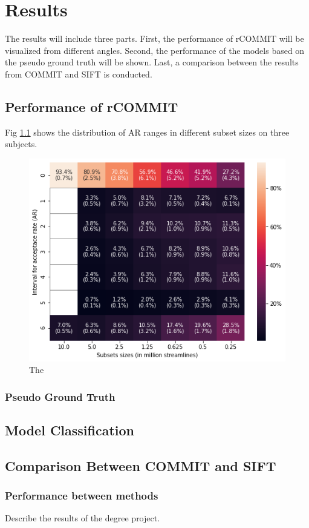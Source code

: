 \chapter{Results}

The results will include three parts. 
First, the performance of rCOMMIT will be visualized from different angles. Second, the performance of the models based on the 
pseudo ground truth will be shown. Last, a comparison between the results from COMMIT and SIFT is conducted.

\section{Performance of rCOMMIT}

Fig \ref{fig:heatmap} shows the distribution of AR ranges in different subset sizes on three subjects. 

\begin{figure}[ht]
    \centering
    \includegraphics[width= 15cm]{figures/heatmap.png}
        \caption{The 
        }
    \label{fig:heatmap}
\end{figure}

\subsection{Pseudo Ground Truth}

\section{Model Classification}

\section{Comparison Between COMMIT and SIFT}

\subsection{Performance between methods}








Describe the results of the degree project.
